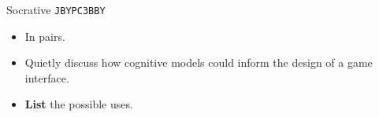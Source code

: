 \begin{frame}[fragile]{Socrative \texttt{JBYPC3BBY}}
	\begin{itemize}
		\item In pairs.
		\item Quietly discuss how cognitive models could inform the design of a game interface.
		\item \textbf{List} the possible uses.
	\end{itemize}
\end{frame}
